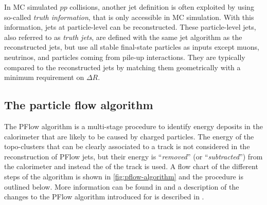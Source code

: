 
In MC simulated $pp$ collisions, another jet definition is often exploited by using so-called \emph{truth information}, that is only accessible in MC simulation. With this information, jets at particle-level can be reconstructed. These particle-level jets, also referred to as \emph{truth jets}, are defined with the same jet algorithm as the reconstructed jets, but use all stable final-state particles as inputs except muons, neutrinos, and particles coming from pile-up interactions. They are typically compared to the reconstructed jets by matching them geometrically with a minimum requirement on $\Delta R$.




\subsection{The particle flow algorithm}
\label{subsec:pflow-algorithm}
The PFlow algorithm is a multi-stage procedure to identify energy deposits in the calorimeter that are likely to be caused by charged particles. The energy of the topo-clusters that can be clearly associated to a track is not considered in the reconstruction of PFlow jets, but their energy is ``\emph{removed}'' (or ``\emph{subtracted}'') from the calorimeter and instead the \pT of the track is used. A flow chart of the different steps of the algorithm is shown in \cref{fig:pflow-algorithm} and the procedure is outlined below. More information can be found in  and a description of the changes to the PFlow algorithm introduced for \RunTwo is described in .

